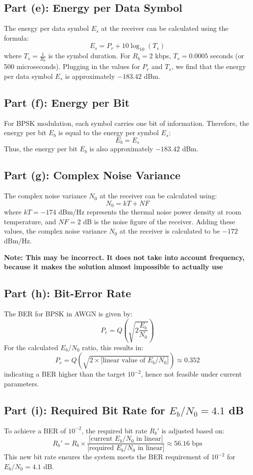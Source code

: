 \documentclass[12pt]{article}
\begin{document}
\subsection*{Part (e): Energy per Data Symbol}
The energy per data symbol \( E_s \) at the receiver can be calculated using the formula:
\[
E_s = P_r + 10 \log_{10}(T_s)
\]
where \( T_s = \frac{1}{R_b} \) is the symbol duration. For \( R_b = 2 \) kbps, \( T_s = 0.0005 \) seconds (or 500 microseconds). Plugging in the values for \( P_r \) and \( T_s \), we find that the energy per data symbol \( E_s \) is approximately \(-183.42\) dBm.

\subsection*{Part (f): Energy per Bit}
For BPSK modulation, each symbol carries one bit of information. Therefore, the energy per bit \( E_b \) is equal to the energy per symbol \( E_s \):
\[
E_b = E_s
\]
Thus, the energy per bit \( E_b \) is also approximately \(-183.42\) dBm.

\subsection*{Part (g): Complex Noise Variance}
The complex noise variance \( N_0 \) at the receiver can be calculated using:
\[
N_0 = kT + NF
\]
where \( kT = -174 \) dBm/Hz represents the thermal noise power density at room temperature, and \( NF = 2 \) dB is the noise figure of the receiver. Adding these values, the complex noise variance \( N_0 \) at the receiver is calculated to be \(-172\) dBm/Hz.

\textbf{Note: This may be incorrect. It does not take into account frequency, because it makes the solution almost impossible to actually use}



\subsection*{Part (h): Bit-Error Rate}
The BER for BPSK in AWGN is given by:
\[
P_e = Q\left(\sqrt{2 \frac{E_b}{N_0}}\right)
\]
For the calculated \(E_b/N_0\) ratio, this results in:
\[
P_e = Q\left(\sqrt{2 \times \text{[linear value of } E_b/N_0]}\right) \approx 0.352
\]
indicating a BER higher than the target \(10^{-2}\), hence not feasible under current parameters.

\subsection*{Part (i): Required Bit Rate for \(E_b/N_0 = 4.1\) dB}
To achieve a BER of \(10^{-2}\), the required bit rate \(R_b'\) is adjusted based on:
\[
R_b' = R_b \times \frac{\text{[current } E_b/N_0 \text{ in linear]}}{\text{[required } E_b/N_0 \text{ in linear]}} \approx 56.16 \text{ bps}
\]
This new bit rate ensures the system meets the BER requirement of \(10^{-2}\) for \(E_b/N_0 = 4.1\) dB.
\end{document}
